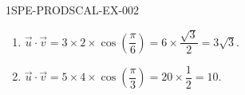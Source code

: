 \begin{corrige}{1SPE-PRODSCAL-EX-002}
\begin{enumerate}
\item $\vec{u} \cdot \vec{v} = 3 \times 2 \times \cos\!\left(\dfrac{\pi}{6}\right) = 6 \times \dfrac{\sqrt{3}}{2} = 3\sqrt{3}$.
\item $\vec{u} \cdot \vec{v} = 5 \times 4 \times \cos\!\left(\dfrac{\pi}{3}\right) = 20 \times \dfrac{1}{2} = 10$.
\end{enumerate}
\end{corrige}
